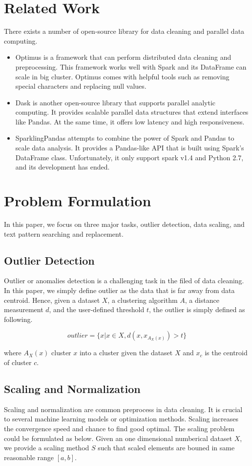 \documentclass[sigconf]{acmart}
\begin{document}
\section{Related Work}
There exists a number of open-source library for data cleaning and parallel data computing. 
\begin{itemize}
	\item{Optimus}\cite{optimus} is a framework that can perform distributed data cleaning and preprocessing. This framework works well with Spark and its DataFrame can scale in big cluster. Optimus comes with helpful tools such as removing special characters and replacing null values.
	\item{Dask}\cite{dask} is another open-source library that supports parallel analytic computing. It provides scalable parallel data structures that extend interfaces like Pandas. At the same time, it offers low latency and high responsiveness.
	\item{SparklingPandas}\cite{sparklingpandas} attempts to combine the power of Spark and Pandas to scale data analysis. It provides a Pandas-like API that is built using Spark's DataFrame class. Unfortunately, it only support spark v1.4 and Python 2.7, and its development has ended.
\end{itemize}

\section{Problem Formulation}
In this paper, we focus on three major tasks, outlier detection, data scaling, and text pattern searching and replacement.
\subsection{Outlier Detection}
Outlier or anomalies detection is a challenging task in the filed of data cleaning\cite{anomal}. In this paper, we simply define outlier as the data that is far away from data centroid. Hence, given a dataset $X$, a clustering algorithm $A$\cite{MMD}, a distance measurement $d$, and the user-defined threshold $t$, the outlier is simply defined as following.

\[ outlier = \{x | x \in X, d( x, x_{A_X(x)} ) > t \}  \]

where $A_X(x)$ cluster $x$ into a cluster given the dataset $X$ and $x_c$  is the centroid of cluster $c$.

\subsection{Scaling and Normalization}
Scaling and normalization are common preprocess in data cleaning. It is crucial to several machine learning models or optimization methods. Scaling increases the convergence speed and chance to find good optimal\cite{convex}. The scaling problem could be formulated as below.
Given an one dimensional numberical dataset $X$, we provide a scaling method $S$ such that scaled elements are bouned in same reasonable range $[a, b]$.
\end{document}
